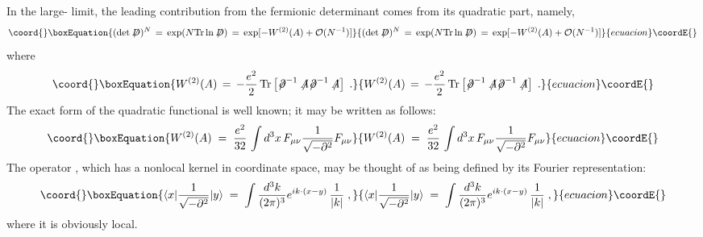\documentclass[12pt,a4paper]{article} \usepackage[latin1] {inputenc}
\begin{document}
In the large-\coordHE{} limit, the leading contribution from the fermionic
determinant comes from its quadratic part, namely,
\begin{equation}\coord{}\boxEquation{\label{eq:fdet}
(\det \not \!\! D)^N \,=\, \exp ( N {\rm Tr} \ln  \not \!\! D )
\,=\, \exp[- W^{(2)}(A) + {\mathcal O}(N^{-1}) ]
}{(\det \not \!\! D)^N \,=\, \exp ( N {\rm Tr} \ln  \not \!\! D )
\,=\, \exp[- W^{(2)}(A) + {\mathcal O}(N^{-1}) ]
}{ecuacion}\coordE{}\end{equation}
where
\begin{equation}\coord{}\boxEquation{
 W^{(2)}(A) \,=\, - \frac{e^2}{2} \, {\rm Tr} \left[ {\not \! \partial}^{-1} \not\!\!A
 {\not \! \partial}^{-1} \not \!\!A \right] \;. 
}{
 W^{(2)}(A) \,=\, - \frac{e^2}{2} \, {\rm Tr} \left[ {\not \! \partial}^{-1} \not\!\!A
 {\not \! \partial}^{-1} \not \!\!A \right] \;. 
}{ecuacion}\coordE{}\end{equation}
The exact form of the quadratic functional \coordHE{} is well known;
it may be written as follows:
\begin{equation}\coord{}\boxEquation{
W^{(2)}(A) \;=\; \frac{e^2}{32} \, \int d^3x \, F_{\mu\nu}
\frac{1}{\sqrt{-\partial^2}} F_{\mu\nu}
}{
W^{(2)}(A) \;=\; \frac{e^2}{32} \, \int d^3x \, F_{\mu\nu}
\frac{1}{\sqrt{-\partial^2}} F_{\mu\nu}
}{ecuacion}\coordE{}\end{equation}
The operator \coordHE{}, which has a nonlocal
kernel in coordinate space, may be thought of as being defined by its
Fourier representation:
\begin{equation}\coord{}\boxEquation{
\langle x|\frac{1}{\sqrt{-\partial^2}}|y\rangle\;=\; 
\int \frac{d^3k}{(2\pi)^3} e^{i k \cdot (x-y)} \, \frac{1}{|k|} \;,
}{
\langle x|\frac{1}{\sqrt{-\partial^2}}|y\rangle\;=\; 
\int \frac{d^3k}{(2\pi)^3} e^{i k \cdot (x-y)} \, \frac{1}{|k|} \;,
}{ecuacion}\coordE{}\end{equation}
where it is obviously local.
\end{document}
